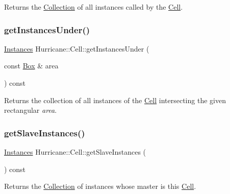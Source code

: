Returns the \mbox{\hyperlink{classHurricane_1_1Collection}{Collection}} of all instances called by the \mbox{\hyperlink{classHurricane_1_1Cell}{Cell}}. \mbox{\label{classHurricane_1_1Cell_a5eb16d9d0f340ad71b81d794f6f8525f}} 
\subsubsection{\texorpdfstring{get\+Instances\+Under()}{getInstancesUnder()}}
{\footnotesize\ttfamily \mbox{\hyperlink{namespaceHurricane_ac9436b03a2926f34ad6863deae2baadc}{Instances}} Hurricane\+::\+Cell\+::get\+Instances\+Under (\begin{DoxyParamCaption}\item[{const \mbox{\hyperlink{classHurricane_1_1Box}{Box}} \&}]{area }\end{DoxyParamCaption}) const}

Returns the collection of all instances of the \mbox{\hyperlink{classHurricane_1_1Cell}{Cell}} intersecting the given rectangular {\itshape area}. \mbox{\label{classHurricane_1_1Cell_a7e51bee5db73dd44f788e591a5c175c8}} 
\subsubsection{\texorpdfstring{get\+Slave\+Instances()}{getSlaveInstances()}}
{\footnotesize\ttfamily \mbox{\hyperlink{namespaceHurricane_ac9436b03a2926f34ad6863deae2baadc}{Instances}} Hurricane\+::\+Cell\+::get\+Slave\+Instances (\begin{DoxyParamCaption}{ }\end{DoxyParamCaption}) const}

Returns the \mbox{\hyperlink{classHurricane_1_1Collection}{Collection}} of instances whose master is this \mbox{\hyperlink{classHurricane_1_1Cell}{Cell}}. \mbox{\label{classHurricane_1_1Cell_a63cb19881279b5af0a4e7dae707ef1bd}} 
